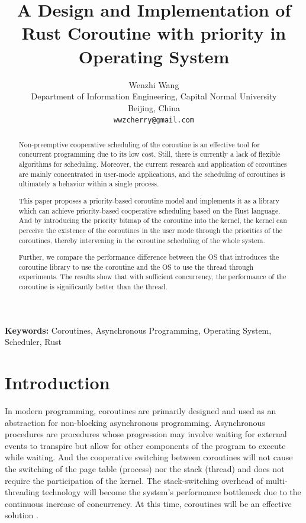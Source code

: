 \documentclass[10pt]{article}
\title{A Design and Implementation of Rust Coroutine with priority in Operating System}
\author{
  Wenzhi Wang \\
  Department of Information Engineering, Capital Normal University \\
  Beijing, China \\
  {\tt wwzcherry@gmail.com}}
\date{}
\begin{document}
\maketitle
\begin{abstract}
Non-preemptive cooperative scheduling of the coroutine is an effective tool for concurrent programming due to its low cost. Still, there is currently a lack of flexible algorithms for scheduling. Moreover, the current research and application of coroutines are mainly concentrated in user-mode applications, and the scheduling of coroutines is ultimately a behavior within a single process. 

This paper proposes a priority-based coroutine model and implements it as a library which can achieve priority-based cooperative scheduling based on the Rust language. And by introducing the priority bitmap of the coroutine into the kernel, the kernel can perceive the existence of the coroutines in the user mode through the priorities of the coroutines, thereby intervening in the coroutine scheduling of the whole system.

Further, we compare the performance difference between the OS that introduces the coroutine library to use the coroutine and the OS to use the thread through experiments. The results show that with sufficient concurrency, the performance of the coroutine is significantly better than the thread.
\end{abstract}

{\bf Keywords:} Coroutines, Asynchronous Programming, Operating System, Scheduler, Rust

\section{Introduction}

In modern programming, coroutines are primarily designed and used as an abstraction for non-blocking asynchronous programming. Asynchronous procedures \cite{waern2021coroutines} are procedures whose progression may involve waiting for external events to transpire but allow for other components of the program to execute while waiting. And the cooperative switching between coroutines will not cause the switching of the page table (process) nor the stack (thread) and does not require the participation of the kernel. The stack-switching overhead of multi-threading technology will become the system's performance bottleneck due to the continuous increase of concurrency. At this time, coroutines will be an effective solution \cite{belson2019survey} .
\end{document}
